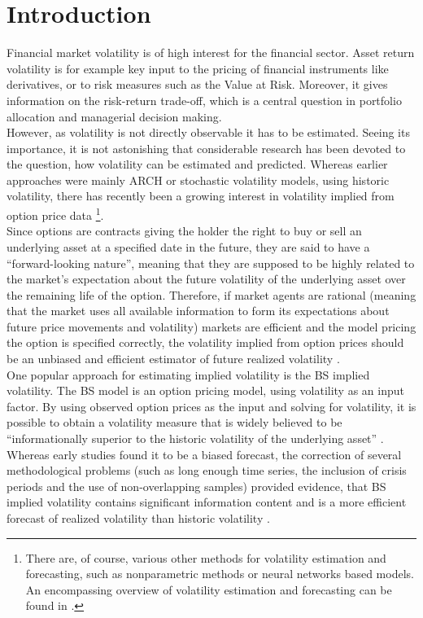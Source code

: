 
\section{Introduction}\label{sec:1Intro}
Financial market volatility is of high interest for the financial sector. Asset return volatility is for example key input to the pricing of financial instruments like derivatives, or to risk measures such as the Value at Risk. Moreover, it gives information on the risk-return trade-off, which is a central question in portfolio allocation and managerial decision making. \\
However, as volatility is not directly observable it has to be estimated. Seeing its importance, it is not astonishing that considerable research has been devoted to the question, how volatility can be estimated and predicted. Whereas earlier approaches were mainly ARCH or stochastic volatility models, using historic volatility, there has recently been a growing interest in volatility implied from option price data \parencite{bakanova2010}\footnote{There are, of course, various other methods for volatility estimation and forecasting, such as nonparametric methods or neural networks based models. An encompassing overview of volatility estimation and forecasting can be found in \textcite{jiang2003}.}.\\
Since options are contracts giving the holder the right to buy or sell an underlying asset at a specified date in the future, they are said to have a ``forward-looking nature'', meaning that they are supposed to be highly related to the market's expectation about the future volatility of the underlying asset over the remaining life of the option. Therefore, if market agents are rational (meaning that the market uses all available information to form its expectations about future price movements and volatility) markets are efficient and the model pricing the option is specified correctly, the volatility implied from option prices should be an unbiased and efficient estimator of future realized volatility \parencite{bakanova2010}.\\
One popular approach for estimating implied volatility is the \ac{BS} implied volatility. The \ac{BS} model is an option pricing model, using volatility as an input factor. By using observed option prices as the input and solving for volatility, it is possible to obtain a volatility measure that is widely believed to be ``informationally superior to the historic volatility of the underlying asset'' \parencite[p.1305]{jiang2003}. Whereas early studies found it to be a biased forecast, the correction of several methodological problems (such as long enough time series, the inclusion of crisis periods and the use of non-overlapping samples) provided evidence, that \ac{BS} implied volatility contains significant information content and is a more efficient forecast of realized volatility than historic volatility \parencite{jiang2003}.\\
